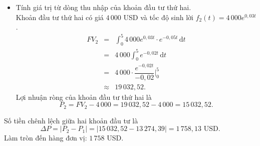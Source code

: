 \begin{ex}
{\begin{itemize}
\begin{eqnarray*}
&=&  3\,000 \displaystyle\int_{0}^{5} e^{-0{,}02t}\,\mathrm{d}t\\
&=& 3\,000\cdot \dfrac{e^{-0{,}02t}}{-0{,}02}\Bigg|_0^5\\
&\approx & 14\,274{,}39.
\end{eqnarray*}
Lợi nhuận ròng của khoản thứ nhất là
\[P_1 = FV_1 - 1\,000 = 14\,274{,}39 - 1\,000 = 13\,274{,}39.\]
\item Tính giá trị từ dòng thu nhập của khoản đầu tư thứ hai.\\
Khoản đầu tư thứ hai có giá $4\,000$ USD và tốc độ sinh lời $f_2(t) = 4\,000e^{0{,}03t}$.
\begin{eqnarray*}
FV_2 &=& \displaystyle\int_{0}^{5} 4\,000e^{0{,}03t} \cdot e^{-0{,}05t}\,\mathrm{d}t\\
&=& 4\,000 \displaystyle\int_{0}^{5} e^{-0{,}02t} \,\mathrm{d}t\\
&=& 4\,000 \cdot\dfrac{e^{-0{,}02t}}{-0{,}02}\Bigg|_0^5\\
&\approx & 19\,032{,}52.
\end{eqnarray*}
Lợi nhuận ròng của khoản đầu tư thứ hai là
\[P_2 = FV_2 - 4\,000 = 19\,032{,}52 - 4\,000 = 15\,032{,}52.\]
\end{itemize}
Số tiền chênh lệch giữa hai khoản đầu tư là
\[\Delta P = \left|P_2 - P_1\right| = \left|15\,032{,}52 - 13\,274{,}39\right| = 1\,758{,}13 \text{ USD}.\]
Làm tròn đến hàng đơn vị: $1\,758$ USD.
}
\end{ex}

